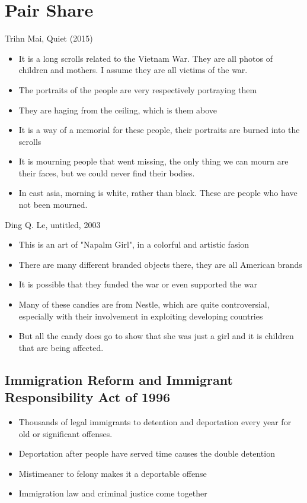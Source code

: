\documentclass{article}
\begin{document}
\section*{Pair Share}

Trihn Mai, Quiet (2015)

\begin{itemize}
  \item It is a long scrolls related to the Vietnam War. They are all
    photos of children and mothers. I assume they are all victims of the war.
  \item The portraits of the people are very respectively portraying them
  \item They are haging from the ceiling, which is them above
  \item It is a way of a memorial for these people, their portraits are
    burned into the scrolls
  \item It is mourning people that went missing, the only thing we can mourn
    are their faces, but we could never find their bodies.
  \item In east asia, morning is white, rather than black. These are people
    who have not been mourned.
\end{itemize}

Ding Q. Le, untitled, 2003

\begin{itemize}
  \item This is an art of "Napalm Girl", in a colorful and artistic fasion
  \item There are many different branded objects there, they are all American brands
  \item It is possible that they funded the war or even supported the war
  \item Many of these candies are from Nestle, which are quite controversial,
    especially with their involvement in exploiting developing countries
  \item But all the candy does go to show that she was just a girl and it is children
    that are being affected.
\end{itemize}

\subsection{Immigration Reform and Immigrant Responsibility Act of 1996}
\begin{itemize}
  \item Thousands of legal immigrants to detention and deportation every year for old
    or significant offenses.
  \item Deportation after people have served time causes the double detention
  \item Mistimeaner to felony makes it a deportable offense
  \item Immigration law and criminal justice come together
\end{itemize}
\end{document}
